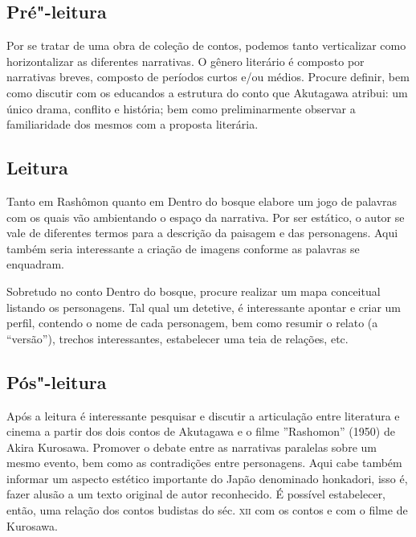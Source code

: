 \documentclass[12pt]{extarticle}
\begin{document}
\subsection{Pré"-leitura}


Por se tratar de uma obra de coleção de contos, podemos
tanto verticalizar como horizontalizar as diferentes narrativas. O
gênero literário é composto por narrativas breves, composto de períodos
curtos e/ou médios. Procure definir, bem como discutir com os educandos
a estrutura do conto que Akutagawa atribui: um único drama, conflito e
história; bem como preliminarmente observar a familiaridade dos mesmos
com a proposta literária.

\subsection{Leitura}


Tanto em Rashômon quanto em Dentro do bosque elabore um jogo
de palavras com os quais vão ambientando o espaço da narrativa. Por ser
estático, o autor se vale de diferentes termos para a descrição da
paisagem e das personagens. Aqui também seria interessante a criação de
imagens conforme as palavras se enquadram.

Sobretudo no conto Dentro do bosque, procure realizar um mapa conceitual
listando os personagens. Tal qual um detetive, é interessante apontar e
criar um perfil, contendo o nome de cada personagem, bem como resumir o
relato (a ``versão''), trechos interessantes, estabelecer uma teia de
relações, etc.

\subsection{Pós"-leitura}


Após a leitura é interessante pesquisar e discutir a
articulação entre literatura e cinema a partir dos dois contos de
Akutagawa e o filme ''Rashomon'' (1950) de Akira Kurosawa. Promover o
debate entre as narrativas paralelas sobre um mesmo evento, bem como as
contradições entre personagens. Aqui cabe também informar um aspecto
estético importante do Japão denominado honkadori, isso é, fazer alusão
a um texto original de autor reconhecido. É possível estabelecer, então,
uma relação dos contos budistas do séc. \textsc{xii} com os contos e com o filme
de Kurosawa.
\end{document}
